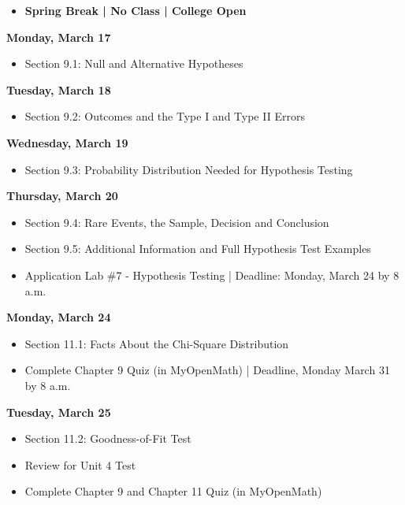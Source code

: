 \documentclass[11pt]{article}
\begin{document}
\begin{itemize}
\item \textbf{Spring Break | No Class | College Open}
\end{itemize}

\textbf{Monday, March 17}

\begin{itemize}
\item Section 9.1: Null and Alternative Hypotheses
\end{itemize}

\textbf{Tuesday, March 18}

\begin{itemize}
\item Section 9.2: Outcomes and the Type I and Type II Errors
\end{itemize}

\textbf{Wednesday, March 19}

\begin{itemize}
\item Section 9.3: Probability Distribution Needed for Hypothesis Testing
\end{itemize}

\textbf{Thursday, March 20}

\begin{itemize}
\item Section 9.4: Rare Events, the Sample, Decision and Conclusion
\item Section 9.5: Additional Information and Full Hypothesis Test Examples
\item Application Lab \#7 - Hypothesis Testing | Deadline:  Monday, March 24 by 8 a.m.
\end{itemize}

\textbf{Monday, March 24}

\begin{itemize}
\item Section 11.1: Facts About the Chi-Square Distribution
\item Complete Chapter 9 Quiz (in MyOpenMath) | Deadline, Monday March 31 by 8 a.m.
\end{itemize}

\textbf{Tuesday, March 25}

\begin{itemize}
\item Section 11.2: Goodness-of-Fit Test
\item Review for Unit 4 Test
\item Complete Chapter 9 and Chapter 11 Quiz (in MyOpenMath)
\end{itemize}
\end{document}
